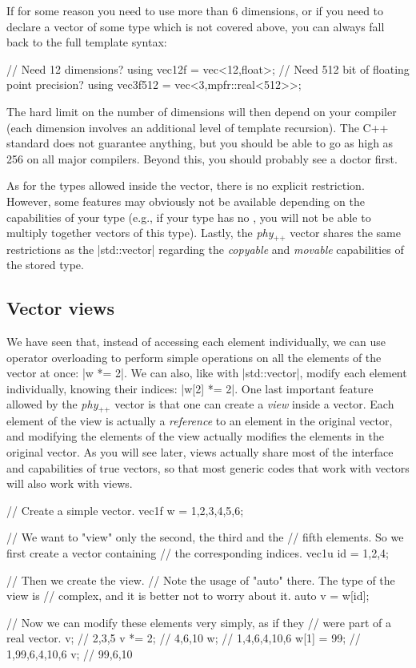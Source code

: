 \documentclass[12pt]{report}
\newcommand{\phypp}{\textit{phy}$_{\text{++}}$\xspace}
\newcommand{\stdvec}{\cppinline|std::vector|\xspace}
\newenvironment{advanced}
{
    \begin{mdframed}[style=advanced,frametitle={Advanced}]
}
{
    \end{mdframed}
}
\begin{document}
\begin{advanced}
If for some reason you need to use more than 6 dimensions, or if you need to declare a vector of some type which is not covered above, you can always fall back to the full template syntax:
\begin{cppcode}
// Need 12 dimensions?
using vec12f = vec<12,float>;
// Need 512 bit of floating point precision?
using vec3f512 = vec<3,mpfr::real<512>>;
\end{cppcode}

The hard limit on the number of dimensions will then depend on your compiler (each dimension involves an additional level of template recursion). The C++ standard does not guarantee anything, but you should be able to go as high as 256 on all major compilers. Beyond this, you should probably see a doctor first.

As for the types allowed inside the vector, there is no explicit restriction. However, some features may obviously not be available depending on the capabilities of your type (e.g., if your type has no , you will not be able to multiply together vectors of this type). Lastly, the \phypp vector shares the same restrictions as the \stdvec regarding the \emph{copyable} and \emph{movable} capabilities of the stored type.
\end{advanced}

\subsection{Vector views \label{SEC:core:overview:views}}

We have seen that, instead of accessing each element individually, we can use operator overloading to perform simple operations on all the elements of the vector at once: \cppinline|w *= 2|. We can also, like with \stdvec, modify each element individually, knowing their indices: \cppinline|w[2] *= 2|. One last important feature allowed by the \phypp vector is that one can create a \emph{view} inside a vector. Each element of the view is actually a \emph{reference} to an element in the original vector, and modifying the elements of the view actually modifies the elements in the original vector. As you will see later, views actually share most of the interface and capabilities of true vectors, so that most generic codes that work with vectors will also work with views.

\begin{cppcode}
// Create a simple vector.
vec1f w = {1,2,3,4,5,6};

// We want to "view" only the second, the third and the
// fifth elements. So we first create a vector containing
// the corresponding indices.
vec1u id = {1,2,4};

// Then we create the view.
// Note the usage of "auto" there. The type of the view is
// complex, and it is better not to worry about it.
auto v = w[id];

// Now we can modify these elements very simply, as if they
// were part of a real vector.
v;         // {2,3,5}
v *= 2;    // {4,6,10}
w;         // {1,4,6,4,10,6}
w[1] = 99; // {1,99,6,4,10,6}
v;         // {99,6,10}
\end{cppcode}
\end{document}
